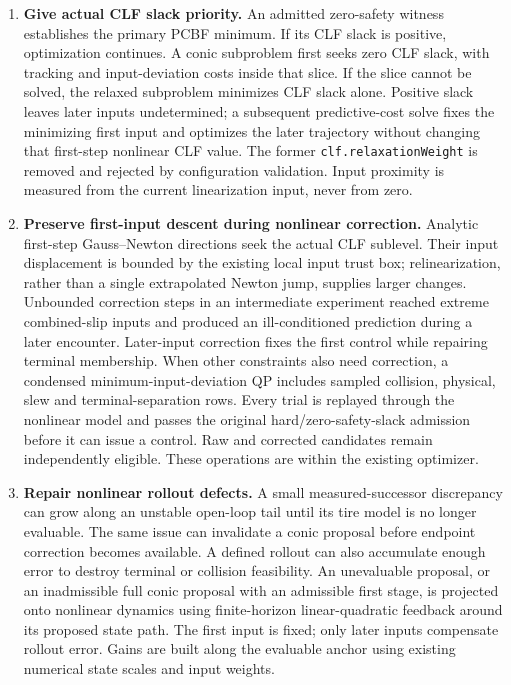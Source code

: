 \documentclass[11pt]{article}
\begin{document}
\begin{enumerate}
\item \textbf{Give actual CLF slack priority.} An admitted zero-safety
witness establishes the primary PCBF minimum. If its CLF slack is positive,
optimization continues. A conic subproblem first seeks zero CLF slack, with
tracking and input-deviation costs inside that slice. If the slice cannot
be solved, the relaxed subproblem minimizes CLF slack alone. Positive slack leaves later inputs undetermined; a subsequent
predictive-cost solve fixes the minimizing first input and optimizes the
later trajectory without changing that first-step nonlinear CLF value. The former
\texttt{clf.relaxationWeight} is removed and rejected by configuration
validation. Input proximity is measured from the current linearization
input, never from zero.
\item \textbf{Preserve first-input descent during nonlinear correction.}
Analytic first-step Gauss--Newton directions seek the actual CLF sublevel.
Their input displacement is bounded by the existing local input trust box;
relinearization, rather than a single extrapolated Newton jump, supplies
larger changes. Unbounded correction steps in an intermediate experiment
reached extreme combined-slip inputs and produced an ill-conditioned
prediction during a later encounter.
Later-input correction fixes the first control while repairing terminal
membership. When other constraints also need correction, a condensed
minimum-input-deviation QP includes sampled collision, physical, slew and
terminal-separation rows. Every trial is replayed through the nonlinear
model and passes the original hard/zero-safety-slack admission before it
can issue a control. Raw and corrected candidates remain independently
eligible. These operations are within the existing optimizer.
\item \textbf{Repair nonlinear rollout defects.} A small measured-successor
discrepancy can grow along an unstable open-loop tail until its tire model
is no longer evaluable. The same issue can invalidate a conic proposal
before endpoint correction becomes available. A defined rollout can also
accumulate enough error to destroy terminal or collision feasibility.
An unevaluable proposal, or an inadmissible full conic proposal with an
admissible first stage, is projected
onto nonlinear dynamics using finite-horizon linear-quadratic feedback
around its proposed state path. The first input is fixed; only later
inputs compensate rollout error. Gains are built along the evaluable
anchor using existing numerical state scales and input weights.

\end{enumerate}
\end{document}
